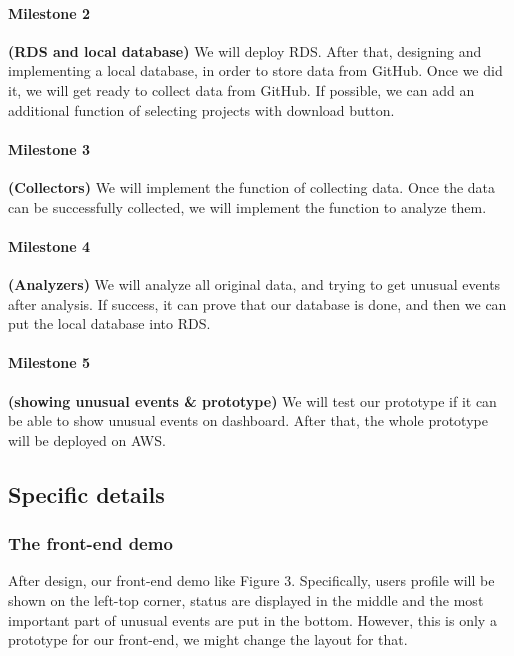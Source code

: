 \documentclass[conference]{IEEEtran}
\begin{document}
\paragraph{\textbf{Milestone 2}}
\textbf{(RDS and local database)} We will deploy RDS. After that, designing and implementing a local database, in order to store data from GitHub. Once we did it, we will get ready to collect data from GitHub. If possible, we can add an additional function of selecting projects with download button. \\

\paragraph{\textbf{Milestone 3}}
\textbf{(Collectors)} We will implement the function of collecting data. Once the data can be successfully collected, we will implement the function to analyze them. \\

\paragraph{\textbf{Milestone 4}}
\textbf{(Analyzers)} We will analyze all original data, and trying to get unusual events after analysis. If success, it can prove that our database is done, and then we can put the local database into RDS.\\

\paragraph{\textbf{Milestone 5}}
\textbf{(showing unusual events \& prototype)} We will test our prototype if it can be able to show unusual events on dashboard. After that, the whole prototype will be deployed on AWS.\\

\subsection{Specific details}
\subsubsection{The front-end demo}
After design, our front-end demo like Figure 3. Specifically, users profile will be shown on the left-top corner, status are displayed in the middle and the most important part of unusual events are put in the bottom. However, this is only a prototype for our front-end, we might change the layout for that.
\end{document}
